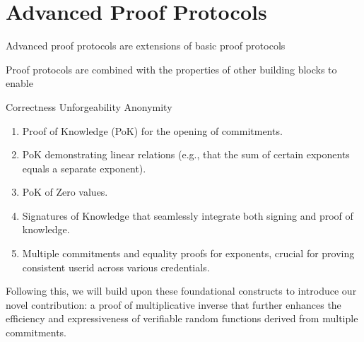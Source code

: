 




\section{Advanced Proof Protocols}



Advanced proof protocols are extensions of basic proof protocols

Proof protocols are combined with the properties of other building blocks to enable 

Correctness
Unforgeability
Anonymity



\begin{enumerate}
    \item Proof of Knowledge (PoK) for the opening of commitments.
    \item PoK demonstrating linear relations (e.g., that the sum of certain exponents equals a separate exponent).
    \item PoK of Zero values.
    \item Signatures of Knowledge that seamlessly integrate both signing and proof of knowledge.
    \item Multiple commitments and equality proofs for exponents, crucial for proving consistent userid across various credentials.
\end{enumerate}
Following this, we will build upon these foundational constructs to introduce our novel contribution: a proof of multiplicative inverse that further enhances the efficiency and expressiveness of verifiable random functions derived from multiple commitments.

